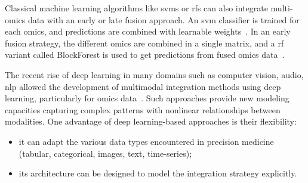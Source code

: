 \documentclass[../main.tex]{subfiles}
\begin{document}
	Classical machine learning algorithms like \glspl{svm} or \glspl{rf} can also integrate multi-omics data with an early or late fusion approach.
	An \gls{svm} classifier is trained for each omics, and predictions are combined with learnable weights~\cite{CarrilloPerez2022}.
	In an early fusion strategy, the different omics are combined in a single matrix, and a \gls{rf} variant called BlockForest is used to get predictions from fused omics data~\cite{Hornung2019}.

	The recent rise of deep learning in many domains such as computer vision, audio, \gls{nlp} allowed the development of multimodal integration methods using deep learning, particularly for omics data~\cite{Kang2021}.
	Such approaches provide new modeling capacities capturing complex patterns with nonlinear relationships between modalities.
	One advantage of deep learning-based approaches is their flexibility:
	\begin{itemize}[nosep]
		\item it can adapt the various data types encountered in precision medicine (tabular, categorical, images, text, time-series);
		\item its architecture can be designed to model the integration strategy explicitly.
	\end{itemize}

\end{document}
